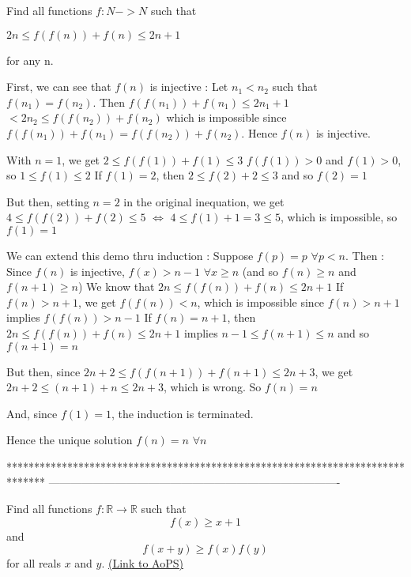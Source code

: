 \begin{solution}
	\begin{tcolorbox}Find all functions $ f: N - > N$ such that

$ 2n \le f(f(n)) + f(n) \le 2n + 1$

for any n.\end{tcolorbox}

First, we can see that $ f(n)$ is injective :
Let $ n_1<n_2$ such that $ f(n_1)=f(n_2)$. Then $ f(f(n_1))+f(n_1) \le 2n_1+1$ $ < 2n_2\le f(f(n_2))+f(n_2)$ which is impossible since $ f(f(n_1))+f(n_1) = f(f(n_2))+f(n_2)$. Hence $ f(n)$ is injective.

With $ n=1$, we get $ 2\le f(f(1))+f(1) \le 3$
$ f(f(1))>0$ and $ f(1)>0$, so $ 1\le f(1)\le 2$
If $ f(1)=2$, then $ 2\le f(2)+2 \le 3$ and so $ f(2)=1$

But then, setting $ n=2$ in the original inequation, we get $ 4\le f(f(2))+f(2)\le 5$ $ \iff$ $ 4\le f(1)+1=3 \le 5$, which is impossible, so $ f(1)=1$

We can extend this demo thru induction :
Suppose $ f(p)=p$ $ \forall p<n$. Then :
Since $ f(n)$ is injective, $ f(x)>n-1$ $ \forall x\ge n$ (and so $ f(n)\ge n$ and $ f(n+1)\ge n$)
We know that $ 2n\le f(f(n))+f(n)\le 2n+1$
If $ f(n)>n+1$, we get $ f(f(n))<n$, which is impossible since $ f(n)>n+1$ implies $ f(f(n))>n-1$
If $ f(n)=n+1$, then $ 2n\le f(f(n))+f(n)\le 2n+1$ implies $ n-1\le f(n+1)\le n$ and so $ f(n+1)=n$

But then, since $ 2n+2\le f(f(n+1))+f(n+1)\le 2n+3$, we get $ 2n+2\le (n+1)+n\le 2n+3$, which is wrong.
So $ f(n)=n$

And, since $ f(1)=1$, the induction is terminated.

Hence the unique solution $ \boxed{f(n)=n}$ $ \forall n$
\end{solution}
*******************************************************************************
-------------------------------------------------------------------------------

\begin{problem}
	Find all functions $f: \mathbb R \to \mathbb R$ such that
\[ f(x) \ge x + 1\] and \[ f(x+y) \ge f(x)f(y)\] for all reals $x$ and $y$.
	\flushright \href{https://artofproblemsolving.com/community/c6h307861}{(Link to AoPS)}
\end{problem}




